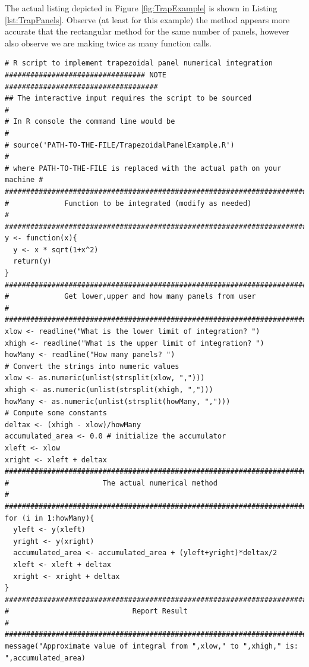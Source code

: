 The actual listing depicted in Figure \ref{fig:TrapExample} is shown in Listing \ref{lst:TrapPanels}. 
Observe (at least for this example) the method appears more accurate that the rectangular method for the same number of panels, however also observe we are making twice as many function calls.
\clearpage

\begin{lstlisting}[caption=R code demonstrating Trapezoidal Panel Numerical Integration, label=lst:TrapPanels]
# R script to implement trapezoidal panel numerical integration
################################# NOTE ####################################
## The interactive input requires the script to be sourced                #
# In R console the command line would be                                  #
# source('PATH-TO-THE-FILE/TrapezoidalPanelExample.R')                    #
# where PATH-TO-THE-FILE is replaced with the actual path on your machine #
###########################################################################
#             Function to be integrated (modify as needed)                #
###########################################################################
y <- function(x){
  y <- x * sqrt(1+x^2)
  return(y)
}
###########################################################################
#             Get lower,upper and how many panels from user               #
###########################################################################
xlow <- readline("What is the lower limit of integration? ")  
xhigh <- readline("What is the upper limit of integration? ")
howMany <- readline("How many panels? ")
# Convert the strings into numeric values
xlow <- as.numeric(unlist(strsplit(xlow, ",")))
xhigh <- as.numeric(unlist(strsplit(xhigh, ",")))
howMany <- as.numeric(unlist(strsplit(howMany, ",")))
# Compute some constants
deltax <- (xhigh - xlow)/howMany  
accumulated_area <- 0.0 # initialize the accumulator
xleft <- xlow
xright <- xleft + deltax
##########################################################################
#                      The actual numerical method                       #
##########################################################################
for (i in 1:howMany){
  yleft <- y(xleft)
  yright <- y(xright)
  accumulated_area <- accumulated_area + (yleft+yright)*deltax/2
  xleft <- xleft + deltax
  xright <- xright + deltax
}
##########################################################################
#                             Report Result                              #
##########################################################################
message("Approximate value of integral from ",xlow," to ",xhigh," is: ",accumulated_area)
\end{lstlisting}

